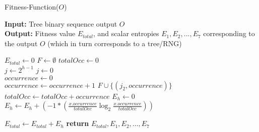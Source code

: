 \documentclass[a4paper,10.5pt]{article}
\begin{document}
\begin{algorithm}[H]
  \caption{Fitness-Function($O$)}
  \textbf{Input:} Tree binary sequence output $O$\\
  \textbf{Output:} Fitness value $E_{total}$, and scalar entropies $E_1, E_2, ..., E_7$ corresponding to the output $O$ (which in turn corresponds to a tree/RNG)\\ 
  \begin{algorithmic}[1]
   
   \State $E_{total} \gets 0$
    
	\State $F \gets \emptyset$
	\State $totalOcc \gets 0$\\
	\State $j \gets 2^{h-1}$ 
	 
		\State $j \gets 0$
	\EndIf\\
	 
		\State $occurrence \gets 0$\\
			 
				\State $occurrence \gets occurrence + 1$
			\EndIf
		\EndFor
		\State $F \cup \{(j_2, occurrence)\}$ 
		\State $totalOcc \gets totalOcc + occurrence$
	\EndFor
	\State $E_h \gets 0$ 
		\State $E_h \gets E_h + \left(-1 * \left( \frac{x.occurrence}{totalOcc} \log_2 \frac{x.occurrence}{totalOcc}\right)\right) $	
	\EndFor

	\State $E_{total} \gets E_{total} + E_h$
    \EndFor
    \State \textbf{return} $E_{total}, E_1, E_2, ..., E_7$
  \end{algorithmic}
\end{algorithm}
\end{document}
